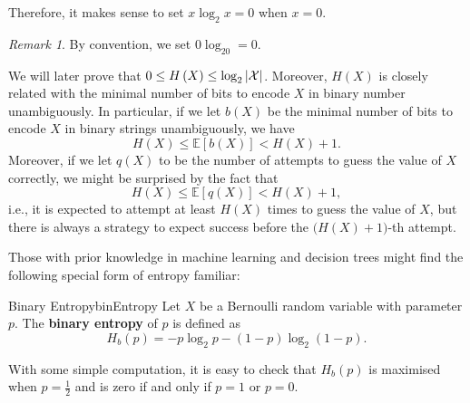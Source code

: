 \documentclass[math, code]{amznotes}
\theoremstyle{remark}
\newtheorem*{remark}{Remark}
\begin{document}
Therefore, it makes sense to set $x\log_2x = 0$ when $x = 0$.
\begin{notebox}
    \begin{remark}
        By convention, we set $0\log_20 = 0$.
    \end{remark}
\end{notebox}
We will later prove that $0 \leq H\left(X\right) \leq \log_2{\left\lvert {\mathcal{X}} \right\rvert}$. Moreover, $H\left(X\right)$ is closely related with the minimal number of bits to encode $X$ in binary number unambiguously. In particular, if we let $b\left(X\right)$ be the minimal number of bits to encode $X$ in binary strings unambiguously, we have 
\begin{equation*}
    H\left(X\right) \leq \mathbb{E}[b\left(X\right)] < H\left(X\right) + 1.
\end{equation*}
Moreover, if we let $q\left(X\right)$ to be the number of attempts to guess the value of $X$ correctly, we might be surprised by the fact that 
\begin{equation*}
    H\left(X\right) \leq \mathbb{E}[q\left(X\right)] < H\left(X\right) + 1,
\end{equation*}
i.e., it is expected to attempt at least $H\left(X\right)$ times to guess the value of $X$, but there is always a strategy to expect success before the $\bigl(H\left(X\right) + 1\bigr)$-th attempt.

Those with prior knowledge in machine learning and decision trees might find the following special form of entropy familiar:
\begin{dfnbox}{Binary Entropy}{binEntropy}
    Let $X$ be a Bernoulli random variable with parameter $p$. The {\color{red} \textbf{binary entropy}} of $p$ is defined as 
    \begin{equation*}
        H_b\left(p\right) = -p\log_2p - \left(1 - p\right)\log_2\left(1 - p\right).
    \end{equation*}
\end{dfnbox}
With some simple computation, it is easy to check that $H_b\left(p\right)$ is maximised when $p = \frac{1}{2}$ and is zero if and only if $p = 1$ or $p = 0$.
\end{document}
